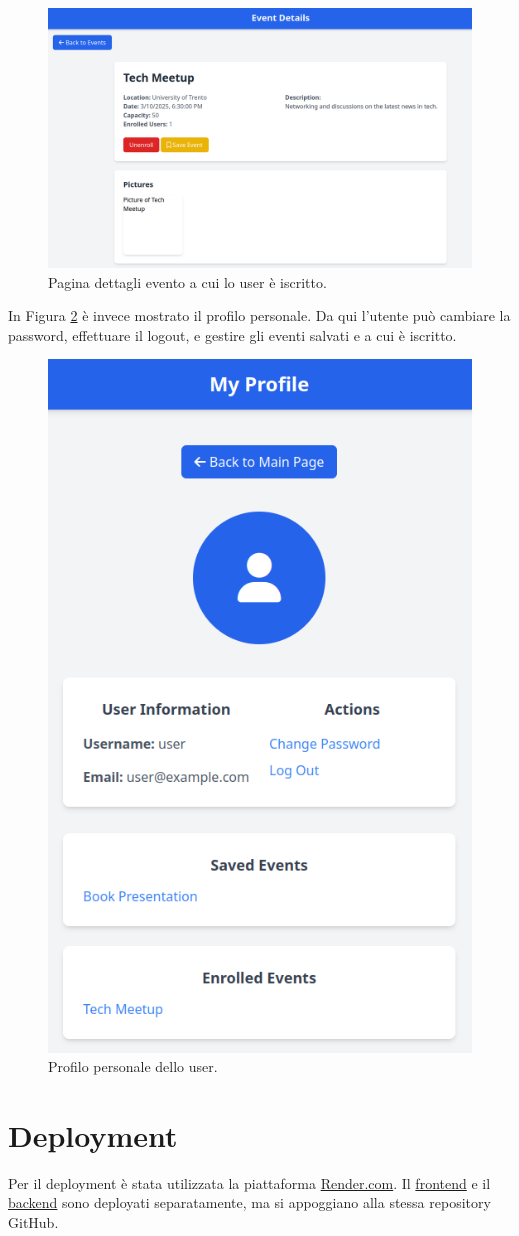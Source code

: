 \documentclass[9pt]{extarticle}
\begin{document}
\newpage

\begin{figure}[!htb]
	\centering
	\includegraphics[width=0.9\linewidth]{./images/EventDetails3.png}
	\caption{Pagina dettagli evento a cui lo user è iscritto.}
	\label{fig:eventDetails3}
\end{figure}

In Figura \ref{fig:profile} è invece mostrato il profilo personale. Da qui l'utente può cambiare la password, effettuare il logout, e gestire gli eventi salvati e a cui è iscritto.

\begin{figure}[!htb]
	\centering
	\includegraphics[width=0.4\linewidth]{./images/Profile.png}
	\caption{Profilo personale dello user.}
	\label{fig:profile}
\end{figure}
\newpage

\section{Deployment}

Per il deployment è stata utilizzata la piattaforma \href{https://render.com/}{Render.com}. Il \href{https://is-progetto-1.onrender.com}{frontend} e il \href{https://is-progetto.onrender.com}{backend} sono deployati separatamente, ma si appoggiano alla stessa repository GitHub.

	
\end{document}
